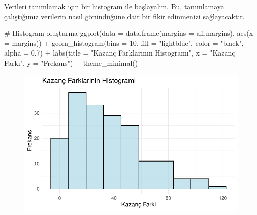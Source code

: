 \documentclass[
  letterpaper,
  DIV=11,
  numbers=noendperiod]{scrartcl}
\newenvironment{Shaded}{\begin{snugshade}}{\end{snugshade}}
\newcommand{\AttributeTok}[1]{\textcolor[rgb]{0.40,0.45,0.13}{#1}}
\newcommand{\CommentTok}[1]{\textcolor[rgb]{0.37,0.37,0.37}{#1}}
\newcommand{\DecValTok}[1]{\textcolor[rgb]{0.68,0.00,0.00}{#1}}
\newcommand{\FloatTok}[1]{\textcolor[rgb]{0.68,0.00,0.00}{#1}}
\newcommand{\FunctionTok}[1]{\textcolor[rgb]{0.28,0.35,0.67}{#1}}
\newcommand{\NormalTok}[1]{\textcolor[rgb]{0.00,0.23,0.31}{#1}}
\newcommand{\SpecialCharTok}[1]{\textcolor[rgb]{0.37,0.37,0.37}{#1}}
\newcommand{\StringTok}[1]{\textcolor[rgb]{0.13,0.47,0.30}{#1}}
\begin{document}
Verileri tanımlamak için bir histogram ile başlayalım. Bu, tanımlamaya
çalıştığımız verilerin nasıl göründüğüne dair bir fikir edinmenizi
sağlayacaktır.

\begin{Shaded}
\begin{Highlighting}[]
\CommentTok{\# Histogram oluşturma}
\FunctionTok{ggplot}\NormalTok{(}\AttributeTok{data =} \FunctionTok{data.frame}\NormalTok{(}\AttributeTok{margins =}\NormalTok{ afl.margins), }\FunctionTok{aes}\NormalTok{(}\AttributeTok{x =}\NormalTok{ margins)) }\SpecialCharTok{+}
  \FunctionTok{geom\_histogram}\NormalTok{(}\AttributeTok{bins =} \DecValTok{10}\NormalTok{, }\AttributeTok{fill =} \StringTok{"lightblue"}\NormalTok{, }\AttributeTok{color =} \StringTok{"black"}\NormalTok{, }\AttributeTok{alpha =} \FloatTok{0.7}\NormalTok{) }\SpecialCharTok{+}
  \FunctionTok{labs}\NormalTok{(}\AttributeTok{title =} \StringTok{"Kazanç Farklarının Histogramı"}\NormalTok{, }\AttributeTok{x =} \StringTok{"Kazanç Farkı"}\NormalTok{, }\AttributeTok{y =} \StringTok{"Frekans"}\NormalTok{) }\SpecialCharTok{+}
  \FunctionTok{theme\_minimal}\NormalTok{()}
\end{Highlighting}
\end{Shaded}

\begin{figure}[H]

{\centering \includegraphics{4_hafta_tanimlayici_istatistik_files/figure-pdf/unnamed-chunk-16-1.pdf}

}

\end{figure}
\end{document}
